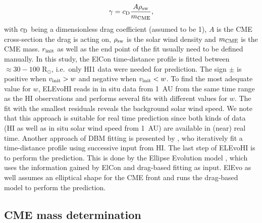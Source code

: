 \documentclass[draft]{agujournal}
\begin{document}
\begin{equation}
\gamma=c_{\rm D} \frac{A \rho_{\rm sw}}{m_{\rm CME}},
\label{eq:gamma}
\end{equation}
with $c_{\rm D}$ being a dimensionless drag coefficient (assumed to be 1), $A$ is the CME cross-section the drag is acting on, $\rho_{\rm sw}$ is the solar wind density and $m_{\rm CME}$ is the CME mass.
$r_{\rm init}$ as well as the end point of the fit usually need to be defined manually. In this study, the ElCon time-distance profile is fitted between $\approx 30-100$ R$_\odot$, i.e.\ only HI1 data were needed for prediction. The sign $\pm$ is positive when $v_{\rm init} > w$ and negative when $v_{\rm init} < w$. To find the most adequate value for $w$, ELEvoHI reads in in situ data from 1~AU from the same time range as the HI observations and performs several fits with different values for $w$. The fit with the smallest residuals reveals the background solar wind speed. We note that this approach is suitable for real time prediction since both kinds of data (HI as well as in situ solar wind speed from 1~AU) are available in (near) real time. Another approach of DBM fitting is presented by \citet{zic15}, who iteratively fit a time-distance profile using successive input from HI.
The last step of ELEvoHI is to perform the prediction. This is done by the Ellipse Evolution model \citep[ElEvo;][]{moe15}, which uses the information gained by ElCon and drag-based fitting as input. ElEvo as well assumes an elliptical shape for the CME front and runs the drag-based model \citep[][]{vrs13} to perform the prediction.


\subsection{CME mass determination}
\end{document}

